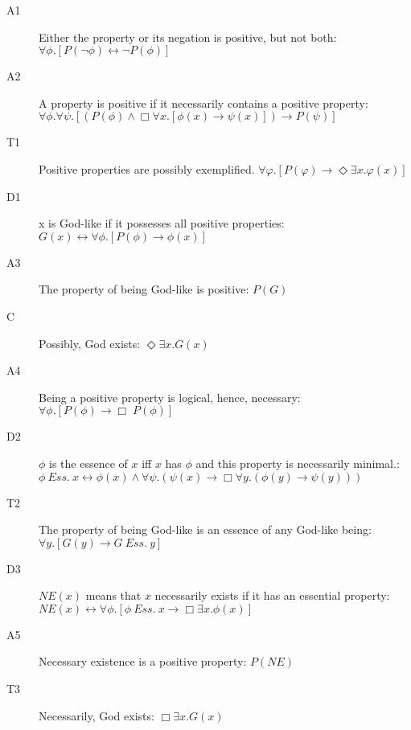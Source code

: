 \documentclass{llncs}
\newcommand{\imp}{\rightarrow}
\newcommand{\biimp}{\leftrightarrow}
\newcommand{\all}{\forall}
\newcommand{\ex}{\exists}
\newcommand{\nec}{\Box} %
\newcommand{\pos}{\Diamond} %
\newcommand{\ess}[2]{#1 \ \mathit{Ess.} \ #2}
\newcommand{\NE}{\mathit{NE}}
\begin{document}
\allowdisplaybreaks[1] 
\begin{description}
\item[A1] Either the property or its negation is positive, but not
  both:  \hfill 
  $\all \phi. [P(\neg \phi) \biimp \neg P(\phi)]$
\item[A2] A property is positive if it necessarily  contains a
  positive property:  \\ \phantom{b} \hfill 
  $\all \phi. \all \psi.[(P(\phi) \wedge \nec \all x.[\phi(x)
  \imp \psi(x)]) \imp P(\psi)]$ 
\item[T1] Positive properties are possibly exemplified. \hfill $\all \varphi. [P(\varphi) \imp \pos \ex x.\varphi(x)]$
\item[D1] x is God-like if it possesses all positive properties: \hfill
  $G(x) \biimp \forall \phi. [P(\phi) \to \phi(x)]$
\item[A3]  The property of being God-like is positive: \hfill   $P(G)$
\item[C\phantom{1}] Possibly, God exists: \hfill $\pos \ex x. G(x)$
\item[A4]  Being a positive property is logical, hence,
  necessary: \hfill 
  $\all \phi.[P(\phi) \to \Box \; P(\phi)]$
\item[D2] $\phi$ is the essence of $x$ iff $x$ has $\phi$ and this
  property is necessarily minimal.:\\
  \phantom{b} \hfill $\ess{\phi}{x} \biimp \phi(x) \wedge \all
  \psi. (\psi(x) \imp \nec \all y. (\phi(y) \imp \psi(y)))$
\item[T2]  The property of being God-like is an essence of any
  God-like being: \hfill $\all y.[G(y) \imp \ess{G}{y}]$ 
\item[D3] $\NE(x)$ means that $x$ necessarily exists if it has an
  essential property: \\
  \phantom{b} \hfill $\NE(x) \biimp \all \phi.[\ess{\phi}{x} \imp \nec \ex x.\phi(x)]$
\item[A5] Necessary existence is a positive property: \hfill $P(\NE)$
\item[T3] Necessarily, God exists: \hfill $\nec \ex x. G(x)$ 
\end{description}
\end{document}
